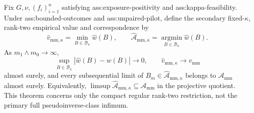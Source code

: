 Fix \(G,\nu,(f_i)_{i=1}^n\) satisfying ass:exposure-positivity and ass:kappa-feasibility.  Under ass:bounded-outcomes and ass:unpaired-pilot, define the secondary fixed-\(\kappa\), rank-two empirical value and correspondence by
\[
\widehat v_{\mathrm{mm},\kappa}=\min_{B\in\mathcal B_\kappa}\widehat w(B),
\qquad
\widehat{\mathcal A}_{\mathrm{mm},\kappa}=\operatorname*{argmin}_{B\in\mathcal B_\kappa}\widehat w(B).
\]
As \(m_1\wedge m_0\to\infty\),
\[
\sup_{B\in\mathcal B_\kappa}|\widehat w(B)-w(B)|\to0,
\qquad
\widehat v_{\mathrm{mm},\kappa}\to v_{\mathrm{mm}}
\]
almost surely, and every subsequential limit of \(B_m\in\widehat{\mathcal A}_{\mathrm{mm},\kappa}\) belongs to \(\mathcal A_{\mathrm{mm}}\) almost surely.  Equivalently, \(\limsup\widehat{\mathcal A}_{\mathrm{mm},\kappa}\subseteq\mathcal A_{\mathrm{mm}}\) in the projective quotient.  This theorem concerns only the compact regular rank-two restriction, not the primary full pseudoinverse-class infimum.